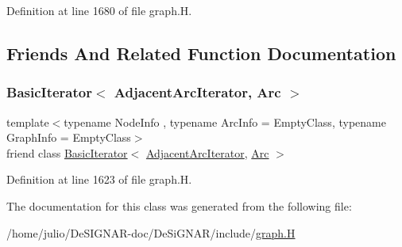 Definition at line 1680 of file graph.\+H.



\subsection{Friends And Related Function Documentation}
\mbox{\label{class_designar_1_1_graph_1_1_adjacent_arc_iterator_a73ad70d76f3331ee4b07451db1347918}} 
\subsubsection{\texorpdfstring{Basic\+Iterator$<$ Adjacent\+Arc\+Iterator, Arc $>$}{BasicIterator< AdjacentArcIterator, Arc >}}
{\footnotesize\ttfamily template$<$typename Node\+Info , typename Arc\+Info  = Empty\+Class, typename Graph\+Info  = Empty\+Class$>$ \\
friend class \hyperlink{class_designar_1_1_basic_iterator}{Basic\+Iterator}$<$ \hyperlink{class_designar_1_1_graph_1_1_adjacent_arc_iterator}{Adjacent\+Arc\+Iterator}, \hyperlink{class_designar_1_1_graph_a74c730ef4ce2d20f998d72bd25c2b5bf}{Arc} $>$\hspace{0.3cm}{\ttfamily [friend]}}



Definition at line 1623 of file graph.\+H.



The documentation for this class was generated from the following file\+:\begin{DoxyCompactItemize}
\item 
/home/julio/\+De\+S\+I\+G\+N\+A\+R-\/doc/\+De\+Si\+G\+N\+A\+R/include/\hyperlink{graph_8_h}{graph.\+H}\end{DoxyCompactItemize}
